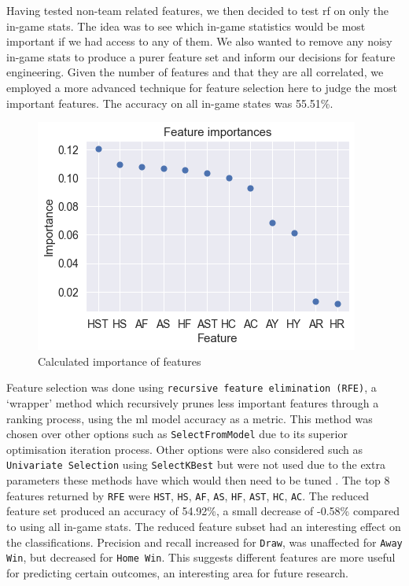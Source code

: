 \documentclass{article}
\newcommand{\sw}[1]{\texttt{#1}}
\begin{document}
Having tested non-team related features, we then decided to test \gls{rf} on only the in-game stats. The idea was to see which in-game statistics would be most important if we had access to any of them. We also wanted to remove any noisy in-game stats to produce a purer feature set and inform our decisions for feature engineering. Given the number of features and that they are all correlated, we employed a more advanced technique for feature selection here to judge the most important features. The accuracy on all in-game states was 55.51\%.

\begin{figure}[!htb]
    \centering
    \includegraphics[width=0.5\linewidth]{Images/Figure 2.png}
    \caption{Calculated importance of features }
    \label{fig:featureimportance}
\end{figure}
\vspace{-0.8em}

Feature selection was done using \sw{recursive feature elimination (RFE)}, a ‘wrapper’ method which recursively prunes less important features through a ranking process, using the \gls{ml} model accuracy as a metric. This method was chosen over other options such as \sw{SelectFromModel} due to its superior optimisation iteration process. Other options were also considered such as \sw{Univariate Selection} using \sw{SelectKBest} but were not used due to the extra parameters these methods have which would then need to be tuned \cite{ippolitomediumfeatureselection}. The top 8 features returned by \sw{RFE} were \sw{HST}, \sw{HS}, \sw{AF}, \sw{AS}, \sw{HF}, \sw{AST}, \sw{HC}, \sw{AC}. The reduced feature set produced an accuracy of 54.92\%, a small decrease of -0.58\% compared to using all in-game stats. The reduced feature subset had an interesting effect on the classifications. Precision and recall increased for \sw{Draw}, was unaffected for \sw{Away Win}, but decreased for \sw{Home Win}. This suggests different features are more useful for predicting certain outcomes, an interesting area for future research.
\end{document}
